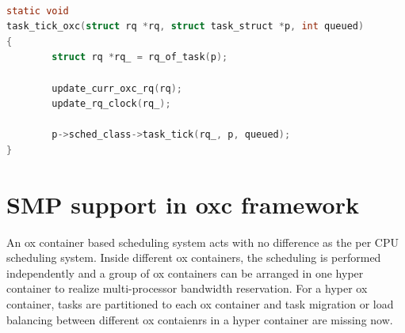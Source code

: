 \begin{lstlisting}[language=C, label={lst:task_tick_oxc},
		caption={The most frequently called entry to update a container's runtime}]
			
static void 
task_tick_oxc(struct rq *rq, struct task_struct *p, int queued)
{
        struct rq *rq_ = rq_of_task(p);

        update_curr_oxc_rq(rq);
        update_rq_clock(rq_);

        p->sched_class->task_tick(rq_, p, queued);
}
\end{lstlisting}

\section{SMP support in oxc framework}
An ox container based scheduling system acts with no difference as the 
per CPU scheduling system. Inside different ox containers, the 
scheduling is performed independently and a group of ox containers
can be arranged in one hyper container to realize multi-processor 
bandwidth reservation. For a hyper ox container, tasks are partitioned 
to each ox container and task migration or load balancing between 
different ox contaienrs in a hyper container are missing now.


